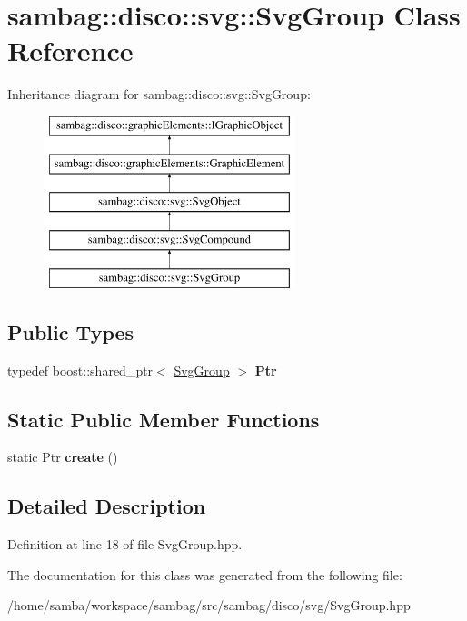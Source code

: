 \hypertarget{classsambag_1_1disco_1_1svg_1_1_svg_group}{
\section{sambag::disco::svg::SvgGroup Class Reference}
\label{classsambag_1_1disco_1_1svg_1_1_svg_group}
}
Inheritance diagram for sambag::disco::svg::SvgGroup:\begin{figure}[H]
\begin{center}
\leavevmode
\includegraphics[height=5.000000cm]{classsambag_1_1disco_1_1svg_1_1_svg_group}
\end{center}
\end{figure}
\subsection*{Public Types}
\begin{DoxyCompactItemize}
\item 
\hypertarget{classsambag_1_1disco_1_1svg_1_1_svg_group_a151838b5d1420428d57e8da808daf019}{
typedef boost::shared\_\-ptr$<$ \hyperlink{classsambag_1_1disco_1_1svg_1_1_svg_group}{SvgGroup} $>$ {\bfseries Ptr}}
\label{classsambag_1_1disco_1_1svg_1_1_svg_group_a151838b5d1420428d57e8da808daf019}

\end{DoxyCompactItemize}
\subsection*{Static Public Member Functions}
\begin{DoxyCompactItemize}
\item 
\hypertarget{classsambag_1_1disco_1_1svg_1_1_svg_group_af211e966e3ec192db5c46a30a1b6de97}{
static Ptr {\bfseries create} ()}
\label{classsambag_1_1disco_1_1svg_1_1_svg_group_af211e966e3ec192db5c46a30a1b6de97}

\end{DoxyCompactItemize}


\subsection{Detailed Description}


Definition at line 18 of file SvgGroup.hpp.



The documentation for this class was generated from the following file:\begin{DoxyCompactItemize}
\item 
/home/samba/workspace/sambag/src/sambag/disco/svg/SvgGroup.hpp\end{DoxyCompactItemize}
